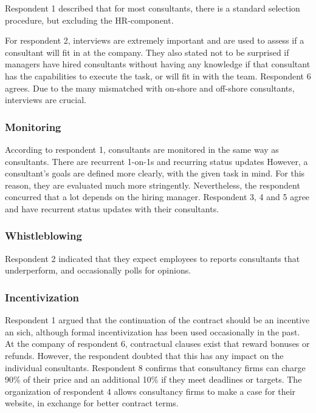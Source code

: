 \documentclass[12pt]{article}
\begin{document}
Respondent 1 described that for most consultants, there is a standard
selection procedure, but excluding the HR-component.

For respondent 2, interviews are extremely important and are used to
assess if a consultant will fit in at the company. They also stated not
to be surprised if managers have hired consultants without having any
knowledge if that consultant has the capabilities to execute the task,
or will fit in with the team. Respondent 6 agrees. Due to the many
mismatched with on-shore and off-shore consultants, interviews are
crucial.

\subsubsection{Monitoring}\label{monitoring-1}

According to respondent 1, consultants are monitored in the same way as
consultants. There are recurrent 1-on-1s and recurring status updates
However, a consultant's goals are defined more clearly, with the given
task in mind. For this reason, they are evaluated much more stringently.
Nevertheless, the respondent concurred that a lot depends on the hiring
manager. Respondent 3, 4 and 5 agree and have recurrent status updates
with their consultants.

\subsubsection{Whistleblowing}\label{whistleblowing-1}

Respondent 2 indicated that they expect employees to reports consultants
that underperform, and occasionally polls for opinions.

\subsubsection{Incentivization}\label{incentivization-1}

Respondent 1 argued that the continuation of the contract should be an
incentive an sich, although formal incentivization has been used
occasionally in the past. At the company of respondent 6, contractual
clauses exist that reward bonuses or refunds. However, the respondent
doubted that this has any impact on the individual consultants.
Respondent 8 confirms that consultancy firms can charge 90\% of their
price and an additional 10\% if they meet deadlines or targets. The
organization of respondent 4 allows consultancy firms to make a case for
their website, in exchange for better contract terms.
\end{document}
